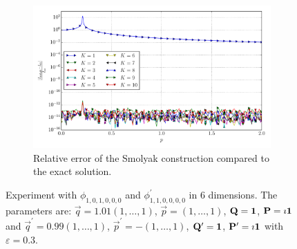 \documentclass[a4paper,10pt]{article}
\begin{document}
\begin{figure}[ht!]
\begin{subfigure}[t]{0.5\linewidth}
    \includegraphics[width=\linewidth]{./plots/tp_sg_6d_conv_p_(1,0,1,0,0,0)_(1,1,0,0,0,0)_err_rel_nsd_gk.pdf}
    \caption{Relative error of the Smolyak construction compared to the exact solution.}
    \label{fig:tp_sg_6d_conv_p_101000_110000_err_rel_nsd_gk}
  \end{subfigure}
  \label{fig:tp_sg_6d_conv_p_101000_110000}
  \caption{Experiment with $\phi_{1,0,1,0,0,0}$ and $\phi_{1,1,0,0,0,0}^{\prime}$
  in 6 dimensions.
  The parameters are:
  $\vec{q} = 1.01 (1,\ldots,1)$,
  $\vec{p} = (1,\ldots,1)$,
  $\mathbf{Q} = \mathbf{1}$,
  $\mathbf{P} = \imath \mathbf{1}$
  and
  $\vec{q}^\prime = 0.99 (1,\ldots,1)$,
  $\vec{p}^\prime = -(1,\ldots,1)$,
  $\mathbf{Q}^\prime = \mathbf{1}$,
  $\mathbf{P}^\prime = \imath \mathbf{1}$
  with $\varepsilon=0.3$.}
\end{figure}
\end{document}

